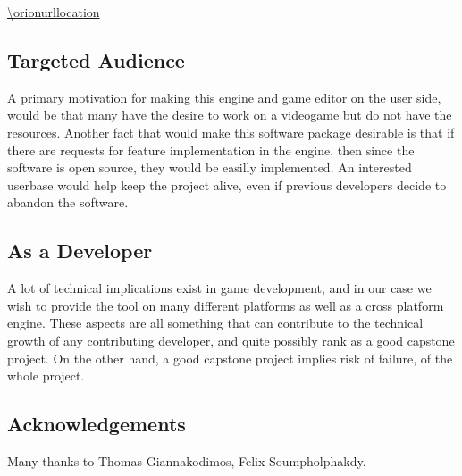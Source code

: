 \url{\orionurllocation}

\subsection{Targeted Audience}

A primary motivation for making this engine and game editor on the user side,
would be that many have the desire to work on a videogame but do not have the
resources. Another fact that would make this software package desirable is that
if there are requests for feature implementation in the engine, then since the
software is open source, they would be easilly implemented. An interested
userbase would help keep the project alive, even if previous developers decide
to abandon the software.

\subsection{As a Developer}

A lot of technical implications exist in game development, and in our case we
wish to provide the tool on many different platforms as well as a cross platform
engine. These aspects are all something that can contribute to the technical
growth of any contributing developer, and quite possibly rank as a good capstone
project. On the other hand, a good capstone project implies risk of failure, of
the whole project.

\subsection{Acknowledgements}

Many thanks to Thomas Giannakodimos, Felix Soumpholphakdy.
